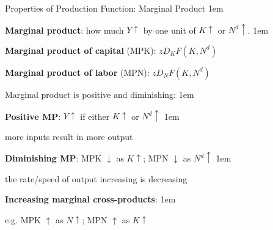 \documentclass[11pt,aspectratio=43]{beamer}
\let\olditemize=\itemize
\let\endolditemize=\enditemize
\renewenvironment{itemize}{\olditemize \itemsep1em}{\endolditemize}
\theoremstyle{definition}
\begin{document}
\begin{frame}{Properties of Production Function: Marginal Product}
\label{slide:Properties_of_Production_Function__Marginal_Product}
\begin{itemize}
    \item  \textbf{Marginal product}: how much $ Y \uparrow $ by one unit of $ K \uparrow  $ or $ N^{d} \uparrow $.
    \begin{itemize}
        \item \textbf{Marginal product of capital} (MPK): $z D_{K}F( K, N^{d} )$
        \item \textbf{Marginal product of labor} (MPN): $z D_{N}F( K, N^{d} )$
    \end{itemize}
    \item Marginal product is \alert{positive} and \alert{diminishing}:
    \begin{itemize}
        \item \textbf{Positive MP}: $ Y \uparrow  $ if either $ K\uparrow  $ or $ N^{d} \uparrow  $
        \begin{itemize}
            \item more inputs result in more output
        \end{itemize}
        \item \textbf{Diminishing MP}: MPK $ \downarrow  $ as $ K \uparrow  $; MPN $ \downarrow  $ as $ N^{d}  \uparrow  $
        \begin{itemize}
            \item the \alert{rate/speed} of output increasing is decreasing
        \end{itemize}
    \end{itemize}
    \item \textbf{Increasing marginal cross-products}:
    \begin{itemize}
        \item e.g. MPK $ \uparrow  $ as $ N \uparrow  $; MPN $ \uparrow  $ as $ K \uparrow  $
    \end{itemize}
\end{itemize}
\end{frame}
\end{document}
